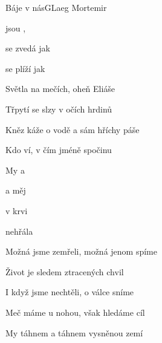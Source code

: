 \begin{song}{Báje v nás}{G}{Laeg Mortemir}

\begin{SBVerse}

 jsou ,  

 se zvedá jak  

   

 se plíží jak 

\end{SBVerse}

\begin{SBVerse}

Světla na mečích, oheň Eliáše

Třpytí se slzy v očích hrdinů

Kněz káže o vodě a sám hříchy páše

Kdo ví, v čím jméně spočinu

\end{SBVerse}

\begin{SBChorus}

My  a   

  a  měj 

  v krvi 

 nehřála 

\end{SBChorus}

\begin{SBVerse}

Možná jsme zemřeli, možná jenom spíme

Život je sledem ztracených chvil

I když jsme nechtěli, o válce sníme

Meč máme u nohou, však hledáme cíl

\end{SBVerse}

\begin{SBChorus}

\end{SBChorus}

\begin{SBChorus*}

My táhnem a táhnem vysněnou zemí


\end{SBChorus*}
\end{song}
